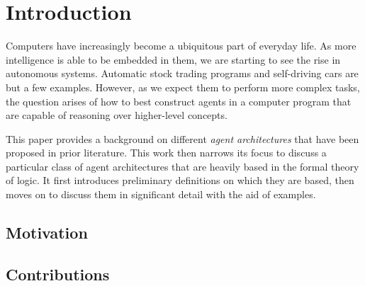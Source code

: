 \chapter{Introduction}

%
%

Computers have increasingly become a ubiquitous part of everyday life.
As more intelligence is able to be embedded in them, we are starting to see the rise in autonomous systems.
Automatic stock trading programs and self-driving cars are but a few examples.
However, as we expect them to perform more complex tasks, the question arises of how to best construct agents in a computer program that are capable of reasoning over higher-level concepts.

This paper provides a background on different \textit{agent architectures} that have been proposed in prior literature.
This work then narrows its focus to discuss a particular class of agent architectures that are heavily based in the formal theory of logic.
It first introduces preliminary definitions on which they are based, then moves on to discuss them in significant detail with the aid of examples.

\section{Motivation}

\section{Contributions}
